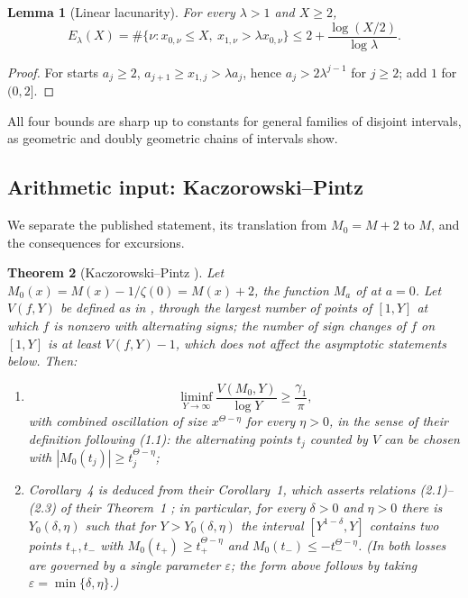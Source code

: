 \documentclass[11pt]{amsart}
\numberwithin{equation}{section}
\theoremstyle{plain}
\newtheorem{theorem}{Theorem}[section]
\newtheorem{lemma}[theorem]{Lemma}
\theoremstyle{definition}
\theoremstyle{remark}
\begin{document}
\begin{lemma}[Linear lacunarity]
\label{lem:linear-lacunary}
For every $\lambda>1$ and $X\ge2$,
\begin{equation}
\label{eq:linear-lacunary-count}
E_\lambda(X)=\#\{\nu:x_{0,\nu}\le X,\ x_{1,\nu}>\lambda x_{0,\nu}\}
\le2+\frac{\log(X/2)}{\log\lambda}.
\end{equation}
\end{lemma}

\begin{proof}
For starts $a_j\ge2$, $a_{j+1}\ge x_{1,j}>\lambda a_j$, hence
$a_j>2\lambda^{j-1}$ for $j\ge2$; add $1$ for $(0,2]$.
\end{proof}

All four bounds are sharp up to constants for general families of disjoint
intervals, as geometric and doubly geometric chains of intervals show.

\subsection{Arithmetic input: Kaczorowski--Pintz}

We separate the published statement, its translation from $M_0=M+2$ to
$M$, and the consequences for excursions.

\begin{theorem}[Kaczorowski--Pintz {\cite{KP86}}]
\label{thm:KP-quoted}
Let $M_0(x)=M(x)-1/\zeta(0)=M(x)+2$, the function $M_a$ of \cite{KP86} at
$a=0$. Let $V(f,Y)$ be defined as in \cite{KP86}, through the largest number of
points of $[1,Y]$ at which $f$ is nonzero with alternating signs; the number
of sign changes of $f$ on $[1,Y]$ is at least $V(f,Y)-1$, which does not
affect the asymptotic statements below. Then:
\begin{enumerate}[label=\textup{(\roman*)}]
\item \cite[Corollary~4, p.~178, (2.13)--(2.15)]{KP86}
\begin{equation}
\label{eq:KP-signchanges}
\liminf_{Y\to\infty}\frac{V(M_0,Y)}{\log Y}\ge\frac{\gamma_1}{\pi},
\end{equation}
with combined oscillation of size $x^{\Theta-\eta}$ for every $\eta>0$, in
the sense of their definition following (1.1): the alternating points $t_j$
counted by $V$ can be chosen with $|M_0(t_j)|\ge t_j^{\Theta-\eta}$;
\item Corollary~4 is deduced from their Corollary~1, which asserts relations
(2.1)--(2.3) of their Theorem~1 \cite[pp.~175--176]{KP86}; in particular,
for every $\delta>0$ and $\eta>0$ there is $Y_0(\delta,\eta)$ such that for
$Y>Y_0(\delta,\eta)$ the interval $[Y^{1-\delta},Y]$ contains two points
$t_+,t_-$ with $M_0(t_+)\ge t_+^{\Theta-\eta}$ and
$M_0(t_-)\le-t_-^{\Theta-\eta}$. (In \cite{KP86} both losses are governed
by a single parameter $\varepsilon$; the form above follows by taking
$\varepsilon=\min\{\delta,\eta\}$.)
\end{enumerate}
\end{theorem}
\end{document}
